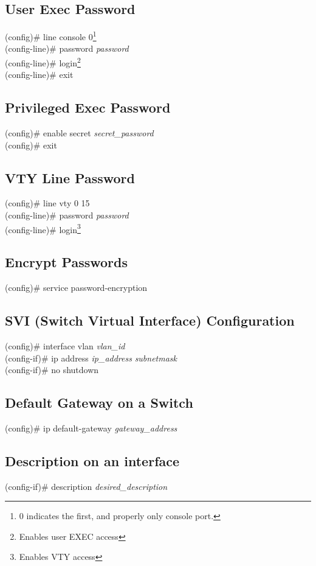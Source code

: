 \subsection{User Exec Password}
	(config)\# line console 0\textrm{\footnote{0 indicates the first, and properly only console port.}} \\
	(config-line)\# password \textit{password} \\
	(config-line)\# login\footnote{Enables user EXEC access} \\
	(config-line)\# exit
	
\subsection{Privileged Exec Password}
	(config)\# enable secret \textit{secret\_password}\\
	(config)\# exit
	
\subsection{VTY Line Password}
	(config)\# line vty 0 15 \\
	(config-line)\# password \textit{password} \\
	(config-line)\# login\footnote{Enables VTY access}

\subsection{Encrypt Passwords}
(config)\# service password-encryption

\subsection{SVI (Switch Virtual Interface) Configuration}
(config)\# interface vlan \textit{vlan\_id} \\
(config-if)\# ip address \textit{ip\_address} \textit{subnetmask} \\
(config-if)\# no shutdown

\subsection{Default Gateway on a Switch}
(config)\# ip default-gateway \textit{gateway\_address}

\subsection{Description on an interface}
(config-if)\# description \textit{desired\_description}

